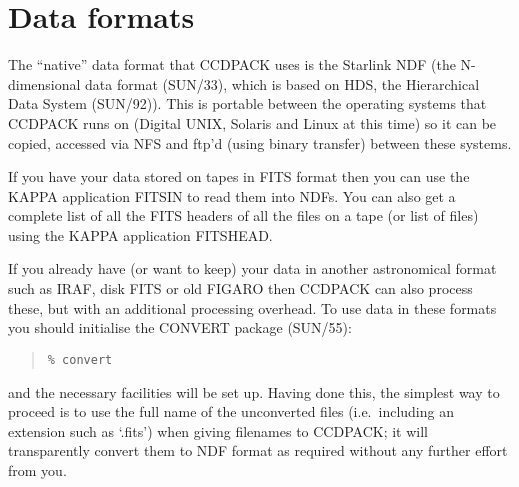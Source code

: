 \documentclass[twoside,11pt]{article}
\newcommand{\latexhtml}[2]{#1}
\newcommand{\xref}[3]{#1}
\newcommand{\xlabel}[1]{}
\renewcommand{\_}{\texttt{\symbol{95}}}
\newcommand{\ttsize}{\latexhtml{\small}{}}
\newenvironment{myquote}{\begin{quote}\ttsize}{\end{quote}}
\begin{document}
\section{Data\label{datatypes}\xlabel{datatypes} formats}
The ``native'' data format that CCDPACK uses is the Starlink NDF (the
N-dimensional data format (\xref{SUN/33}{sun33}{}), which is based on
HDS, the Hierarchical Data System \xref{(SUN/92)}{sun92}{}).  This is
portable between the operating systems that CCDPACK runs on (Digital
UNIX, Solaris and Linux at this time) so it can be copied, accessed
via NFS and ftp'd (using binary transfer) between these systems.

If you have your data stored on tapes in FITS format then you can use
the \xref{KAPPA}{sun95}{} application \xref{FITSIN}{sun95}{FITSIN} to
read them into NDFs. You can also get a complete list of all the FITS
headers of all the files on a tape (or list of files) using the KAPPA
application \xref{FITSHEAD}{sun95}{FITSHEAD}.

If you already have (or want to keep) your data in another
astronomical format such as IRAF, disk FITS or old FIGARO then CCDPACK
can also process these, but with an additional processing overhead. To
use data in these formats you should initialise the CONVERT package
(\xref{SUN/55}{sun55}{}):
\begin{myquote}
\begin{verbatim}
% convert
\end{verbatim}
\end{myquote}
and the necessary facilities will be set up. 
Having done this, the simplest way to proceed is to use the
full name of the unconverted files (i.e.\ including an extension 
such as `.fits') when giving filenames to CCDPACK; it will
transparently convert them to NDF format as required without 
any further effort from you.
\end{document}
